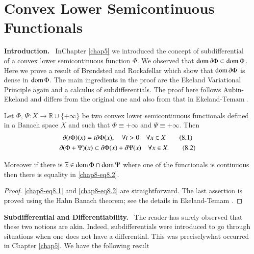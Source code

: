 \chapter{Convex Lower Semicontinuous Functionals}\label{chap8}

{\bf Introduction.}~ In\pageoriginale Chapter \ref{chap5} we
introduced the concept of subdifferential of a convex lower
semicontinuous function $\Phi$. We observed that $\operatorname{dom} \partial \Phi\subset
\operatorname{dom} \Phi$. Here we prove a result of Br{\o}ndsted and Rockafellar
\cite{key18} which show that $\operatorname{dom} \partial \Phi$ is dense in $\operatorname{dom}
\Phi$. The main ingredients in the proof are the Ekeland Variational
Principle again and a calculus of subdifferentials. The proof here
follows Aubin-Ekeland \cite{key6} and differs from the original one
and also from that in Ekeland-Temam \cite{key36}. 

\begin{proposition}\label{chap8-prop8.1}
Let $\Phi$, $\Psi:X\to \mathbb{R}\cup \{+\infty\}$ be two convex lower
semicontinuous functionals defined in a Banach space $X$ and such that
$\Phi\equiv +\infty$ and $\Psi\equiv +\infty$. Then
\begin{gather*}
\partial(t\Phi)(x)=t\partial\Phi(x),\quad \forall t>0\quad \forall x\in
X\tag{8.1}\label{chap8-eq8.1}\\
\partial(\Phi+\Psi)(x)\subset \partial\Phi(x)+\partial\Psi(x)\quad \forall x\in
X.\tag{8.2}\label{chap8-eq8.2} 
\end{gather*}

Moreover if there is $\overline{x}\in \operatorname{dom} \Phi\cap \operatorname{dom} \Psi$ where
one of the functionals is continuous then there is equality in
\eqref{chap8-eq8.2}. 
\end{proposition}

\begin{proof}
\eqref{chap8-eq8.1} and \eqref{chap8-eq8.2} are straightforward. The
last assertion is proved using the Hahn Banach theorem; see the
details in Ekeland-Temam \cite{key36}.
\end{proof}

\noindent
{\bf Subdifferential and Differentiability.}~ The reader has surely
observed that these two notions are akin. Indeed, subdifferentials
were introduced to go through situations when one does not have a
differential. This was precisely\pageoriginale what occurred in
Chapter \ref{chap5}. We have the following result

